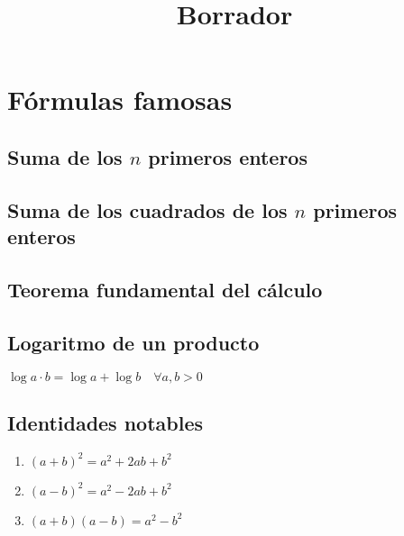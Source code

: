 \documentclass{article}
\author{}
\date{}
\title{Borrador}
\begin{document}
\maketitle


\begin{abstract}

\end{abstract}

\section{Fórmulas famosas}

\subsection{Suma de los $n$ primeros enteros}


\subsection{Suma de los cuadrados de los $n$ primeros enteros}


\subsection{Teorema fundamental del cálculo}


\subsection{Logaritmo de un producto}


$\log a·b = \log a + \log b\quad \forall a,b > 0$\label{form_log}

\subsection{Identidades notables}

\begin{enumerate}
\item $ \left(a+b\right)^2 = a^2 + 2ab + b^2 $
\item $ \left(a-b\right)^2 = a^2 - 2ab + b^2 $
\item $ \left(a+b\right)\left(a-b\right) = a^2-b^2 $
\end{enumerate}
\end{document}
